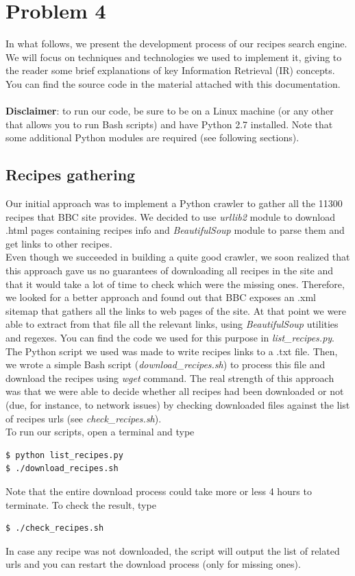 
\section{Problem 4}

In what follows, we present the development process of our recipes search engine. We will focus on techniques and technologies we used to implement it, giving to the reader some brief explanations of key Information Retrieval (IR) concepts. You can find the source code in the material attached with this documentation.\\\\
\textbf{Disclaimer}: to run our code, be sure to be on a Linux machine (or any other that allows you to run Bash scripts) and have Python 2.7 installed. Note that some additional Python modules are required (see following sections).


\subsection{Recipes gathering}

Our initial approach was to implement a Python crawler to gather all the 11300 recipes that BBC site\cite{bbc} provides. We decided to use \textit{urllib2}\cite{urllib2} module to download .html pages containing recipes info and \textit{BeautifulSoup}\cite{beaut_soup} module to parse them and get links to other recipes.\\
Even though we succeeded in building a quite good crawler, we soon realized that this approach gave us no guarantees of downloading all recipes in the site and that it would take a lot of time to check which were the missing ones. Therefore, we looked for a better approach and found out that BBC exposes an .xml sitemap that gathers all the links to web pages of the site. At that point we were able to extract from that file all the relevant links, using \textit{BeautifulSoup}\cite{beaut_soup} utilities and regexes. You can find the code we used for this purpose in \textit{list\_recipes.py}.\\
The Python script we used was made to write recipes links to a .txt file. Then, we wrote a simple Bash script (\textit{download\_recipes.sh}) to process this file and download the recipes using \textit{wget} command. The real strength of this approach was that we were able to decide whether all recipes had been downloaded or not (due, for instance, to network issues) by checking downloaded files against the list of recipes urls (see \textit{check\_recipes.sh}).\\
To run our scripts, open a terminal and type
\begin{lstlisting}
$ python list_recipes.py
$ ./download_recipes.sh
\end{lstlisting}
Note that the entire download process could take more or less 4 hours to terminate. To check the result, type
\begin{lstlisting}
$ ./check_recipes.sh
\end{lstlisting}
In case any recipe was not downloaded, the script will output the list of related urls and you can restart the download process (only for missing ones).



